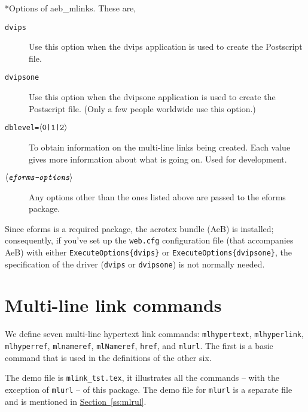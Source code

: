 \documentclass{article}
\makeatletter
\def\anglemeta#1{$\langle\textit{\texttt{#1}}\rangle$}
\let\ameta\anglemeta
\def\darg#1{\texttt{\{#1\}}}
\let\pkg\textsf
\let\opt\texttt
\let\app\textsf
\def\cs#1{\texttt{\@backslashchar#1}}
\renewcommand{\paragraph}
    {\@startsection{paragraph}{4}{0pt}{6pt}{-3pt}{\bfseries}}
\makeatother
\begin{document}
\paragraph*{Options of \pkg{aeb\_mlinks}.} These are,
\begin{description}
  \item[\normalfont\texttt{dvips}] Use this option when the \textsf{dvips} application is used
  to create the Postscript file.
  \item[\normalfont\texttt{dvipsone}] Use this option when the \textsf{dvipsone} application is used
  to create the Post\-script file. (Only a few people worldwide use this option.)
  \item[\normalfont\texttt{dblevel=\ameta{\upshape{0|1|2}}}] To obtain information on the multi-line links being
  created. Each value gives more information about what is going on. Used for development.
  \item[\normalfont\ameta{eforms-options}] Any options other than the ones listed above are passed to the
  \pkg{eforms} package.
\end{description}
Since \pkg{eforms} is a required package, the \pkg{acrotex} bundle
(\pkg{AeB}) is installed; consequently, if you've set up the \texttt{web.cfg}
configuration file (that accompanies \pkg{AeB}) with either
\cs{ExecuteOptions\darg{dvips}} or \cs{ExecuteOptions\darg{dvipsone}}, the
specification of the driver (\opt{dvips} or \opt{dvipsone}) is not normally
needed.

\section{Multi-line link commands}

We define seven multi-line hypertext link commands: \cs{mlhypertext},
\cs{mlhyperlink}, \cs{mlhyperref}, \cs{mlnameref}, \cs{mlNameref},
\cs{href}, and \cs{mlurl}. The first is a basic command that is used in the definitions of
the other six.


The demo file is \texttt{mlink\_tst.tex}, it illustrates all
the commands -- with the exception of \cs{mlurl} -- of this package. The
demo file for \cs{mlurl} is a separate file and is mentioned in
\hyperref[ss:mlrul]{Section~\ref*{ss:mlrul}}.
\end{document}
